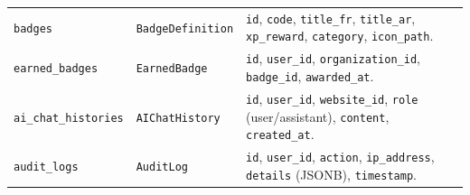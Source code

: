 \begin{table}[!htbp]
\begin{singlespace}
\begin{tabularx}{\textwidth}{l p{3.4cm} X}
\texttt{badges} & \texttt{BadgeDefinition} & \texttt{id}, \texttt{code}, \texttt{title\_fr}, \texttt{title\_ar}, \texttt{xp\_reward}, \texttt{category}, \texttt{icon\_path}. \\
\texttt{earned\_badges} & \texttt{EarnedBadge} & \texttt{id}, \texttt{user\_id}, \texttt{organization\_id}, \texttt{badge\_id}, \texttt{awarded\_at}. \\
\texttt{ai\_chat\_histories} & \texttt{AIChatHistory} & \texttt{id}, \texttt{user\_id}, \texttt{website\_id}, \texttt{role} (user/assistant), \texttt{content}, \texttt{created\_at}. \\
\texttt{audit\_logs} & \texttt{AuditLog} & \texttt{id}, \texttt{user\_id}, \texttt{action}, \texttt{ip\_address}, \texttt{details} (JSONB), \texttt{timestamp}. \\
\bottomrule
\end{tabularx}
\end{singlespace}
\end{table}
